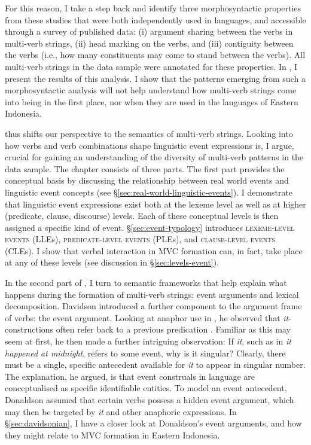 For this reason, I take a step back and identify three morphosyntactic properties from these studies that were both independently used in languages, and accessible through a survey of published data: (i) argument sharing between the verbs in multi-verb strings, (ii) head marking on the verbs, and (iii) contiguity between the verbs (i.e., how many constituents may come to stand between the verbs). All multi-verb strings in the data sample were annotated for these properties. In , I present the results of this analysis. I show that the patterns emerging from such a morphosyntactic analysis will not help understand how multi-verb strings come into being in the first place, nor when they are used in the languages of Eastern Indonesia.

 thus shifts our perspective to the semantics of multi-verb strings. Looking into how verbs and verb combinations shape linguistic event expressions is, I argue, crucial for gaining an understanding of the diversity of multi-verb patterns in the data sample. The chapter consists of three parts. The first part provides the conceptual basis by discussing the relationship between real world events and linguistic event concepts (see §\ref{sec:real-world-linguistic-events}). I demonstrate that linguistic event expressions exist both at the lexeme level as well as at higher (predicate, clause, discourse) levels. Each of these conceptual levels is then assigned a specific kind of event. §\ref{sec:event-typology} introduces \textsc{lexeme-level events} (LLEs), \textsc{predicate-level events} (PLEs), and \textsc{clause-level events} (CLEs). I show that verbal interaction in MVC formation can, in fact, take place at any of these levels (see discussion in §\ref{sec:levels-event}). 

\newpage
In the second part of , I turn to semantic frameworks that help explain what happens during the formation of multi-verb strings: event arguments and lexical decomposition. Davidson introduced a further component to the argument frame of verbs: the event argument. Looking at anaphor use in , he observed that \textit{it}-constructions often refer back to a previous predication \citep{davidson1967logical}. Familiar as this may seem at first, he then made a further intriguing observation: If \textit{it}, such as in \textit{it happened at midnight}, refers to some event, why is it singular? Clearly, there must be a single, specific antecedent available for \textit{it} to appear in singular number. The explanation, he argued, is that event construals in language are conceptualised as specific identifiable entities. To model an event antecedent, Donaldson assumed that certain verbs possess a hidden event argument, which may then be targeted by \textit{it} and other anaphoric expressions. In §\ref{sec:davidsonian}, I have a closer look at Donaldson's event arguments, and how they might relate to MVC formation in Eastern Indonesia. 

